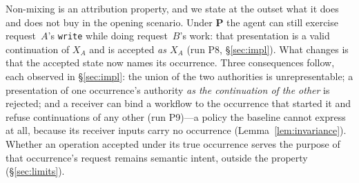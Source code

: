 \documentclass[conference]{IEEEtran}
\begin{document}
Non-mixing is an attribution property, and we state at the outset what it does and does not buy in the opening scenario. Under $\mathbf{P}$ the agent can still exercise request~$A$'s \texttt{write} while doing request~$B$'s work: that presentation is a valid continuation of $X_A$ and is accepted \emph{as $X_A$} (run P8, \S\ref{sec:impl}). What changes is that the accepted state now names its occurrence. Three consequences follow, each observed in \S\ref{sec:impl}: the union of the two authorities is unrepresentable; a presentation of one occurrence's authority \emph{as the continuation of the other} is rejected; and a receiver can bind a workflow to the occurrence that started it and refuse continuations of any other (run P9)---a policy the baseline cannot express at all, because its receiver inputs carry no occurrence (Lemma~\ref{lem:invariance}). Whether an operation accepted under its true occurrence serves the purpose of that occurrence's request remains semantic intent, outside the property (\S\ref{sec:limits}).
\end{document}
